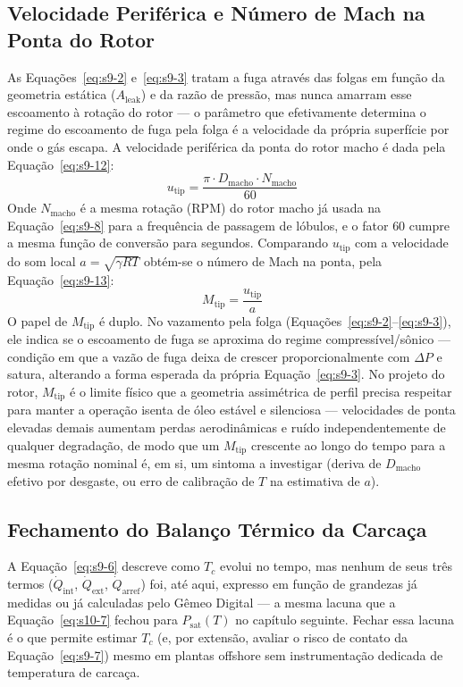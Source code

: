 \documentclass[12pt,a4paper]{article}
\numberwithin{equation}{section}
\numberwithin{table}{section}
\numberwithin{figure}{section}
\begin{document}
{	\subsection{\textbf{Velocidade Periférica e Número de Mach na Ponta do Rotor}}
	As Equações~\eqref{eq:s9-2} e~\eqref{eq:s9-3} tratam a fuga através das folgas em função da geometria estática ($A_{\text{leak}}$) e da razão de pressão, mas nunca amarram esse escoamento à rotação do rotor — o parâmetro que efetivamente determina o regime do escoamento de fuga pela folga é a velocidade da própria superfície por onde o gás escapa. A velocidade periférica da ponta do rotor macho é dada pela Equação~\eqref{eq:s9-12}:
	\begin{equation}\label{eq:s9-12}
 u_{\text{tip}} = \frac{\pi \cdot D_{\text{macho}} \cdot N_{\text{macho}}}{60}
\end{equation}
	Onde $N_{\text{macho}}$ é a mesma rotação (RPM) do rotor macho já usada na Equação~\eqref{eq:s9-8} para a frequência de passagem de lóbulos, e o fator $60$ cumpre a mesma função de conversão para segundos. Comparando $u_{\text{tip}}$ com a velocidade do som local $a = \sqrt{\gamma R T}$ obtém-se o número de Mach na ponta, pela Equação~\eqref{eq:s9-13}:
	\begin{equation}\label{eq:s9-13}
 M_{\text{tip}} = \frac{u_{\text{tip}}}{a}
\end{equation}
	O papel de $M_{\text{tip}}$ é duplo. No vazamento pela folga (Equações~\eqref{eq:s9-2}--\eqref{eq:s9-3}), ele indica se o escoamento de fuga se aproxima do regime compressível/sônico — condição em que a vazão de fuga deixa de crescer proporcionalmente com $\Delta P$ e satura, alterando a forma esperada da própria Equação~\eqref{eq:s9-3}. No projeto do rotor, $M_{\text{tip}}$ é o limite físico que a geometria assimétrica de perfil precisa respeitar para manter a operação isenta de óleo estável e silenciosa \cite{fleming, hanlon} — velocidades de ponta elevadas demais aumentam perdas aerodinâmicas e ruído independentemente de qualquer degradação, de modo que um $M_{\text{tip}}$ crescente ao longo do tempo para a mesma rotação nominal é, em si, um sintoma a investigar (deriva de $D_{\text{macho}}$ efetivo por desgaste, ou erro de calibração de $T$ na estimativa de $a$).

	\subsection{\textbf{Fechamento do Balanço Térmico da Carcaça}}
	A Equação~\eqref{eq:s9-6} descreve como $T_c$ evolui no tempo, mas nenhum de seus três termos ($\dot{Q}_{\text{int}}$, $\dot{Q}_{\text{ext}}$, $\dot{Q}_{\text{arref}}$) foi, até aqui, expresso em função de grandezas já medidas ou já calculadas pelo Gêmeo Digital — a mesma lacuna que a Equação~\eqref{eq:s10-7} fechou para $P_{\text{sat}}(T)$ no capítulo seguinte. Fechar essa lacuna é o que permite estimar $T_c$ (e, por extensão, avaliar o risco de contato da Equação~\eqref{eq:s9-7}) mesmo em plantas offshore sem instrumentação dedicada de temperatura de carcaça.

}
\end{document}
